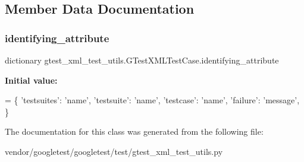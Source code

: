\subsection{Member Data Documentation}
\mbox{\label{classgtest__xml__test__utils_1_1_g_test_x_m_l_test_case_a0e3a4e84e18f29d2248dcd670a0a6ae6}} 
\subsubsection{\texorpdfstring{identifying\+\_\+attribute}{identifying\_attribute}}
{\footnotesize\ttfamily dictionary gtest\+\_\+xml\+\_\+test\+\_\+utils.\+G\+Test\+X\+M\+L\+Test\+Case.\+identifying\+\_\+attribute\hspace{0.3cm}{\ttfamily [static]}}

{\bfseries Initial value\+:}
\begin{DoxyCode}
=  \{
    \textcolor{stringliteral}{'testsuites'}: \textcolor{stringliteral}{'name'},
    \textcolor{stringliteral}{'testsuite'}: \textcolor{stringliteral}{'name'},
    \textcolor{stringliteral}{'testcase'}:  \textcolor{stringliteral}{'name'},
    \textcolor{stringliteral}{'failure'}:   \textcolor{stringliteral}{'message'},
    \}
\end{DoxyCode}


The documentation for this class was generated from the following file\+:\begin{DoxyCompactItemize}
\item 
vendor/googletest/googletest/test/gtest\+\_\+xml\+\_\+test\+\_\+utils.\+py\end{DoxyCompactItemize}
